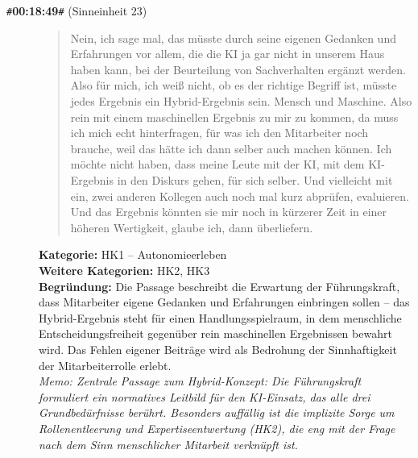 \begin{description}
  \item[\texttt{\#}\textbf{00:18:49}\texttt{\#} (Sinneinheit 23)]
  \begin{quote}
  Nein, ich sage mal, das müsste durch seine eigenen Gedanken und Erfahrungen vor allem, die die KI ja gar nicht in unserem Haus haben kann, bei der Beurteilung von Sachverhalten ergänzt werden. Also für mich, ich weiß nicht, ob es der richtige Begriff ist, müsste jedes Ergebnis ein Hybrid-Ergebnis sein. Mensch und Maschine. Also rein mit einem maschinellen Ergebnis zu mir zu kommen, da muss ich mich echt hinterfragen, für was ich den Mitarbeiter noch brauche, weil das hätte ich dann selber auch machen können. Ich möchte nicht haben, dass meine Leute mit der KI, mit dem KI-Ergebnis in den Diskurs gehen, für sich selber. Und vielleicht mit ein, zwei anderen Kollegen auch noch mal kurz abprüfen, evaluieren. Und das Ergebnis könnten sie mir noch in kürzerer Zeit in einer höheren Wertigkeit, glaube ich, dann überliefern.
  \end{quote}
  \textbf{Kategorie:} HK1 -- Autonomieerleben\\
  \textbf{Weitere Kategorien:} HK2, HK3\\
  \textbf{Begr\"undung:} Die Passage beschreibt die Erwartung der Führungskraft, dass Mitarbeiter eigene Gedanken und Erfahrungen einbringen sollen – das Hybrid-Ergebnis steht für einen Handlungsspielraum, in dem menschliche Entscheidungsfreiheit gegenüber rein maschinellen Ergebnissen bewahrt wird. Das Fehlen eigener Beiträge wird als Bedrohung der Sinnhaftigkeit der Mitarbeiterrolle erlebt.
  \\\textit{Memo: Zentrale Passage zum Hybrid-Konzept: Die Führungskraft formuliert ein normatives Leitbild für den KI-Einsatz, das alle drei Grundbedürfnisse berührt. Besonders auffällig ist die implizite Sorge um Rollenentleerung und Expertiseentwertung (HK2), die eng mit der Frage nach dem Sinn menschlicher Mitarbeit verknüpft ist.}
\end{description}
\medskip

